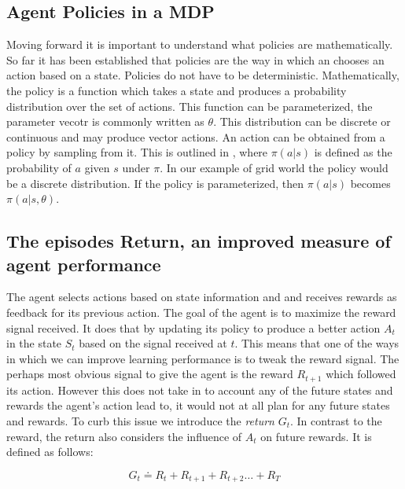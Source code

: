 \subsection{Agent Policies in a MDP}\label{subsec:policies}

Moving forward it is important to understand what policies are mathematically. So far it has been established that policies are the way in which an chooses an action based on a state. Policies do not have to be deterministic. Mathematically, the policy is a function which takes a state and produces a probability distribution over the set of actions. This function can be parameterized, the parameter vecotr is commonly written as $\theta$. This distribution can be discrete or continuous and may produce vector actions. An action can be obtained from a policy by sampling from it. This is outlined in , where $\pi(a|s)$ is defined as the probability of $a$ given $s$ under $\pi$. In our example of grid world the policy would be a discrete distribution. If the policy is parameterized, then $\pi(a|s)$ becomes $\pi(a|s,\theta)$. 

\subsection{The episodes Return, an improved measure of agent performance}\label{subsec:goals}

The agent selects actions based on state information and and receives rewards as feedback for its previous action. The goal of the agent is to maximize the reward signal received. It does that by updating its policy to produce a better action $A_t$ in the state $S_t$ based on the signal received at $t$. This means that one of the ways in which we can improve learning performance is to tweak the reward signal. The perhaps most obvious signal to give the agent is the reward $R_{t+1}$ which followed its action. However this does not take in to account any of the future states and rewards the agent's action lead to, it would not at all plan for any future states and rewards. To curb this issue we introduce the \textit{return} $G_t$. In contrast to the reward, the return also considers the influence of $A_t$ on future rewards. It is defined as follows:

\begin{equation}\label{MDP:return}
    G_t \doteq R_t + R_{t+1} + R_{t+2} \dots + R_T
\end{equation}
\centerline{\small{}}

